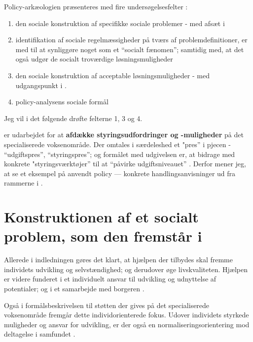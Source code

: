 Policy-arkæologien præsenteres med fire undersøgelsesfelter \autocite[s. 300]{scheurichPolicyArchaeologyNew1994}:
\begin{enumerate}
  \item
    den sociale konstruktion af specifikke sociale problemer - med afsæt i 
  \item
    identifikation af sociale regelmæssigheder på tværs af problemdefinitioner, er med til at synliggøre noget som et “socialt fænomen”; samtidig med, at det også udgør de socialt troværdige løsningsmuligheder 
  \item
    den sociale konstruktion af acceptable løsningsmuligheder - med udgangspunkt i .
  \item
    policy-analysens sociale formål
\end{enumerate}

Jeg vil i det følgende drøfte felterne 1, 3 og 4.

 er udarbejdet for at \textbf{afdække styringsudfordringer og -muligheder} på det specialiserede voksenområde.
Der omtales i særdeleshed et "pres” i pjecen - “udgiftspres”, “styringspres”; og formålet med udgivelsen er, at bidrage med konkrete "styringsværktøjer” til at “påvirke udgiftsniveauet” \autocite[s. 2, 3. m.fl.]{klStyringAfDet2017}.
Derfor mener jeg, at se et eksempel på anvendt policy — konkrete handlingsanvisninger ud fra rammerne i .

\section{Konstruktionen af et socialt problem, som den fremstår i }

Allerede i indledningen gøres det klart, at hjælpen der tilbydes skal fremme individets udvikling og selvstændighed; og derudover øge livskvaliteten.
Hjælpen er videre funderet i et individuelt ansvar til udvikling og udnyttelse af potentialer; og i et samarbejde med borgeren \autocite[§§ 2-3]{social-ogindenrigsministerietBekendtgorelseAfLov2019}.

Også i formålsbeskrivelsen til støtten der gives på det specialiserede voksenområde fremgår  dette individorienterede fokus.
Udover individets styrkede muligheder og ansvar for udvikling, er der også en normaliseringsorientering mod deltagelse i samfundet \autocite[§ 81]{social-ogindenrigsministerietBekendtgorelseAfLov2019}.

